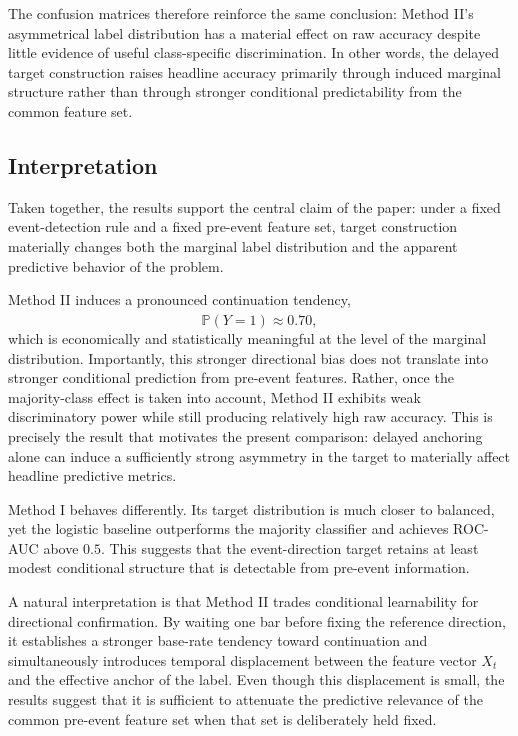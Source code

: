 \documentclass[11pt,a4paper]{article}
\begin{document}
	The confusion matrices therefore reinforce the same conclusion: Method II's asymmetrical label distribution has a material effect on raw accuracy despite little evidence of useful class-specific discrimination. In other words, the delayed target construction raises headline accuracy primarily through induced marginal structure rather than through stronger conditional predictability from the common feature set.

	\subsection{Interpretation}

	Taken together, the results support the central claim of the paper: under a fixed event-detection rule and a fixed pre-event feature set, target construction materially changes both the marginal label distribution and the apparent predictive behavior of the problem.

	Method II induces a pronounced continuation tendency,
	\[
	\widehat{\mathbb{P}}(Y=1)\approx 0.70,
	\]
	which is economically and statistically meaningful at the level of the marginal distribution. Importantly, this stronger directional bias does not translate into stronger conditional prediction from pre-event features. Rather, once the majority-class effect is taken into account, Method II exhibits weak discriminatory power while still producing relatively high raw accuracy. This is precisely the result that motivates the present comparison: delayed anchoring alone can induce a sufficiently strong asymmetry in the target to materially affect headline predictive metrics.

	Method I behaves differently. Its target distribution is much closer to balanced, yet the logistic baseline outperforms the majority classifier and achieves ROC-AUC above \(0.5\). This suggests that the event-direction target retains at least modest conditional structure that is detectable from pre-event information.

	A natural interpretation is that Method II trades conditional learnability for directional confirmation. By waiting one bar before fixing the reference direction, it establishes a stronger base-rate tendency toward continuation and simultaneously introduces temporal displacement between the feature vector \(X_t\) and the effective anchor of the label. Even though this displacement is small, the results suggest that it is sufficient to attenuate the predictive relevance of the common pre-event feature set when that set is deliberately held fixed.
\end{document}
